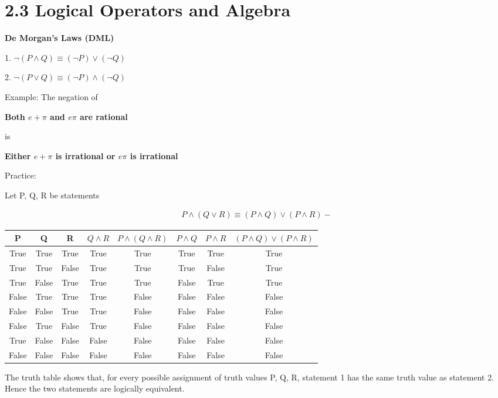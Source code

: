 \documentclass[11pt]{article}
\begin{document}
\section*{2.3 Logical Operators and Algebra}

\textbf{De Morgan's Laws (DML)}

1. $\neg(P \wedge Q) \equiv (\neg P) \vee (\neg Q)$

2. $\neg(P \vee Q) \equiv (\neg P) \wedge (\neg Q)$

\medskip

Example: The negation of

\textbf{Both $e + \pi$ and $e\pi$ are rational}

is

\textbf{Either $e + \pi$ is irrational or $e\pi$ is irrational}

\medskip

Practice:

Let P, Q, R be statements

\begin{align*}
    P \wedge (Q \vee R) \equiv (P \wedge Q) \vee (P \wedge R)-
\end{align*}

\begin{center}
    \begin{tabular}{ |c|c|c|c|c|c|c|c| } 
        \hline
        P & Q & R & $Q \wedge R$ & $P \wedge (Q \wedge R)$ & $P \wedge Q$ & $P \wedge R$ & $(P \wedge Q) \vee (P \wedge R)$\\ 
        \hline
        True & True & True & True & True & True & True & True \\ 
        True & True & False & True & True & True & False & True\\ 
        True & False & True & True & True & False & True & True\\ 
        False & True & True & True & False & False & False & False\\
        False & False & True & True & False & False & False & False\\ 
        False & True & False & True & False & False & False & False\\ 
        True & False& False & False & False & False & False & False\\ 
        False & False & False & False & False & False & False & False\\  
        \hline
    \end{tabular}
\end{center}

The truth table shows that, for every possible assignment of truth values P, Q, R, statement 1 has the same truth value as statement 2. Hence the two statements are logically equivalent.
\end{document}
